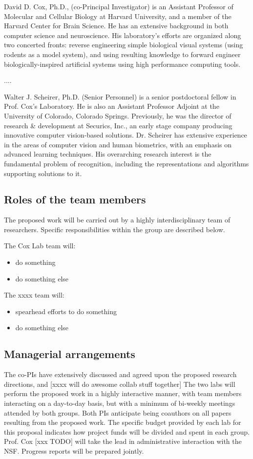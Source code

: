 David D. Cox, Ph.D., (co-Principal Investigator) is an Assistant Professor of Molecular and Cellular Biology at Harvard University, and a member of the Harvard Center for Brain Science. He has an extensive background in both computer science and neuroscience. His laboratory's efforts are organized along two concerted fronts: reverse engineering simple biological visual systems (using rodents as a model system), and using resulting knowledge to forward engineer biologically-inspired artificial systems using high performance computing tools.

....

Walter J. Scheirer, Ph.D. (Senior Personnel) is a senior postdoctoral fellow in Prof. Cox's Laboratory.  He is also an Assistant Professor Adjoint at the University of Colorado, Colorado Springs. Previously, he was the director of research \& development at Securics, Inc., an early stage company producing innovative computer vision-based solutions. Dr. Scheirer has extensive experience in the areas of computer vision and human biometrics, with an emphasis on advanced learning techniques. His overarching research interest is the fundamental problem of recognition, including the representations and algorithms supporting solutions to it.


\subsection{Roles of the team members}

The proposed work will be carried out by a highly interdisciplinary team of researchers.  Specific responsibilities within the group are described below.

The Cox Lab team will:

\begin{itemize}
\item do something
\item do something else
\end{itemize}

The xxxx team will:

\begin{itemize}
\item spearhead efforts to do something
\item do something else
\end{itemize}


\subsection{Managerial arrangements}

The co-PIs have extensively discussed and agreed upon the proposed research directions, and [xxxx will do awesome collab stuff together]
The two labs will perform the proposed work in a highly interactive manner, with team members interacting on a day-to-day basis, but with a minimum of bi-weekly meetings attended by both groups.
Both PIs anticipate being coauthors on all papers resulting from the proposed work.
The specific budget provided by each lab for this proposal indicates how project funds will be divided and spent in each group.
Prof. Cox [xxx TODO] will take the lead in administrative interaction with the NSF.
Progress reports will be prepared jointly.

